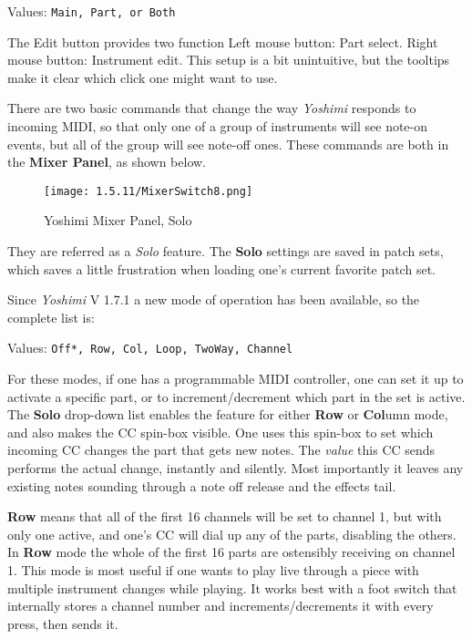    Values: \texttt{Main, Part, or Both}

   The Edit button provides two function
   Left mouse button: Part select.
   Right mouse button: Instrument edit.
   This setup is a bit unintuitive, but the tooltips make it clear
   which click one might want to use.

   There are two basic commands that change the way
   \textsl{Yoshimi} responds to incoming MIDI,
   so that only one of a group of instruments will see note-on events, but all
   of the group will see note-off ones. These commands
   are both in the \textbf{Mixer Panel}, as shown below.
\begin{figure}[H]
   \centering
   \texttt{[image: 1.5.11/MixerSwitch8.png]}
   \caption[Yoshimi Mixer Panel]{Yoshimi Mixer Panel, Solo}
   \label{fig:yoshimi_part_panel_solo}
\end{figure}
   They are referred as a \textsl{Solo} feature.
   The \textbf{Solo} settings are saved in patch sets, which saves a
   little frustration when loading one's current favorite patch set.

   Since \textsl{Yoshimi} V 1.7.1 a new mode of operation has been available, so the complete list is:

   Values: \texttt{Off*, Row, Col, Loop, TwoWay, Channel}

   For these modes, if one has a programmable MIDI controller, one can set it
   up to activate a specific part, or to increment/decrement which part in the
   set is active.  The \textbf{Solo} drop-down list enables the feature for
   either \textbf{Row} or \textbf{Col}umn mode, and also makes the CC spin-box
   visible.
   One uses this spin-box to set which incoming CC changes the part that gets
   new notes.
   The \textsl{value} this CC sends performs the actual change, instantly and
   silently. Most importantly it leaves any existing notes sounding through a
   note off release and the effects tail.

   \textbf{Row} means that all of the first 16 channels will be set to channel
   1, but with only one active, and one's CC will dial up any of the parts,
   disabling the others.
   In \textbf{Row} mode the whole of the first 16 parts are ostensibly
   receiving on channel 1.  This mode is most useful if one wants to play live
   through a piece with multiple instrument changes while playing. It works
   best with a foot switch that internally stores a channel number and
   increments/decrements it with every press, then sends it.

